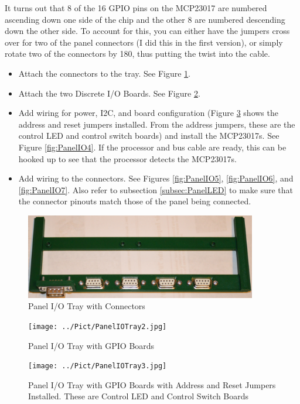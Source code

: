 \documentclass[10pt, openany]{book}
\begin{document}
It turns out that 8 of the 16 GPIO pins on the MCP23017 are numbered ascending down one side of the chip and the other 8 are numbered descending down the other side.  To account for this, you can either have the jumpers cross over for two of the panel connectors (I did this in the first version), or simply rotate two of the connectors by 180\degree{}, thus putting the twist into the cable.
\begin{itemize}
  \item Attach the connectors to the tray.  See Figure \ref{fig:PanelIO1}.
  \item Attach the two Discrete I/O Boards.  See Figure \ref{fig:PanelIO2}.
  \item Add wiring for power, I2C, and board configuration (Figure \ref{fig:PanelIO3} shows the address and reset jumpers installed.  From the address jumpers, these are the control LED and control switch boards) and install the MCP23017s.  See Figure \ref{fig:PanelIO4}.  If the processor and bus cable are ready, this can be hooked up to see that the processor detects the MCP23017s.
  \item Add wiring to the connectors.  See Figures \ref{fig:PanelIO5}, \ref{fig:PanelIO6}, and \ref{fig:PanelIO7}.  Also refer to subsection \ref{subsec:PanelLED} to make sure that the connector pinouts match those of the panel being connected.
\end{itemize}

\begin{figure}[ht!]
  \centering
  \includegraphics[width=0.9\textwidth]{../Pict/PanelIOTray1.jpg}
  \caption{Panel I/O Tray with Connectors}
  \label{fig:PanelIO1}
\end{figure}

\begin{figure}[ht!]
  \centering
  \texttt{[image: ../Pict/PanelIOTray2.jpg]}
  \caption{Panel I/O Tray with GPIO Boards}
  \label{fig:PanelIO2}
\end{figure}

\begin{figure}[ht!]
  \centering
  \texttt{[image: ../Pict/PanelIOTray3.jpg]}
  \caption{Panel I/O Tray with GPIO Boards with Address and Reset Jumpers Installed.  These are Control LED and Control Switch Boards}
  \label{fig:PanelIO3}
\end{figure}
\end{document}
